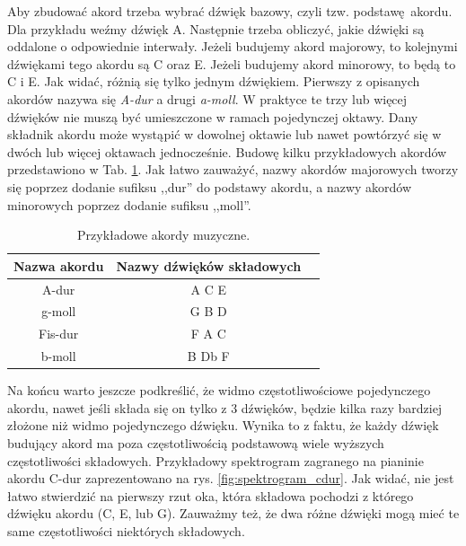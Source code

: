 Aby zbudować akord trzeba wybrać dźwięk bazowy, czyli tzw. podstawę akordu. Dla przykładu weźmy dźwięk A. Następnie trzeba obliczyć, jakie dźwięki są oddalone o odpowiednie interwały. Jeżeli budujemy akord majorowy, to kolejnymi dźwiękami tego akordu są C\sh{} oraz E. Jeżeli budujemy akord minorowy, to będą to C i E. Jak widać, różnią się tylko jednym dźwiękiem. Pierwszy z opisanych akordów nazywa się \emph{A-dur} a drugi \emph{a-moll}. W praktyce te trzy lub więcej dźwięków nie muszą być umieszczone w ramach pojedynczej oktawy. Dany składnik akordu może wystąpić w dowolnej oktawie lub nawet powtórzyć się w dwóch lub więcej oktawach jednocześnie. Budowę kilku przykładowych akordów przedstawiono w Tab. \ref{tab:przykladowe_akordy}. Jak łatwo zauważyć, nazwy akordów majorowych tworzy się poprzez dodanie sufiksu ,,dur'' do podstawy akordu, a nazwy akordów minorowych poprzez dodanie sufiksu ,,moll''.

\begin{table}[htb]
    \centering
    \caption{Przykładowe akordy muzyczne.}
    \label{tab:przykladowe_akordy}
    \begin{tabular}{|c|c|c|} \hline
        Nazwa akordu & Nazwy dźwięków składowych \\ \hline
        A-dur   & A  C\sh{} E  \\
        g-moll  & G  B  D  \\
        Fis-dur  & F\sh{} A\sh{} C\sh{} \\
        b-moll  & B  Db F  \\ \hline
    \end{tabular}
\end{table}

Na końcu warto jeszcze podkreślić, że widmo częstotliwościowe pojedynczego akordu, nawet jeśli składa się on tylko z $3$ dźwięków, będzie kilka razy bardziej złożone niż widmo pojedynczego dźwięku. Wynika to z faktu, że każdy dźwięk budujący akord ma poza częstotliwością podstawową wiele wyższych częstotliwości składowych. Przykładowy spektrogram zagranego na pianinie akordu C-dur zaprezentowano na rys. \ref{fig:spektrogram_cdur}. Jak widać, nie jest łatwo stwierdzić na pierwszy rzut oka, która składowa pochodzi z którego dźwięku akordu (C, E, lub G). Zauważmy też, że dwa różne dźwięki mogą mieć te same częstotliwości niektórych składowych.

